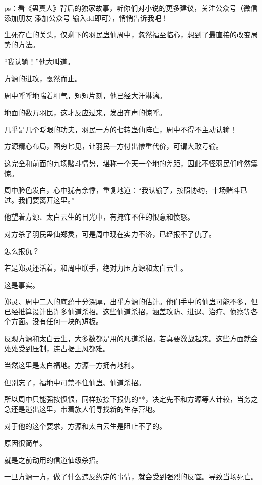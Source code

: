 
\begin{this_body}

ps：看《蛊真人》背后的独家故事，听你们对小说的更多建议，关注公众号（微信添加朋友-添加公众号-输入dd即可），悄悄告诉我吧！

生死存亡的关头，仅剩下的羽民蛊仙周中，忽然福至临心，想到了最直接的改变局势的方法。

“我认输！”他大叫道。

方源的进攻，戛然而止。

周中呼呼地喘着粗气，短短片刻，他已经大汗淋漓。

地面的数万羽民，这才反应过来，发出齐声的惊呼。

几乎是几个眨眼的功夫，羽民一方的七转蛊仙阵亡，周中不得不主动认输！

方源精心布局，图穷匕见，让羽民一方付出惨重代价，可谓大败亏输。

这完全和前面的九场赌斗情势，堪称一个天一个地的差距，因此不怪羽民们哗然震惊。

周中脸色发白，心中犹有余悸，重复地道：“我认输了，按照协约，十场赌斗已过。我们要离开这里。”

他望着方源、太白云生的目光中，有掩饰不住的恨意和愤怒。

对方杀了羽民蛊仙郑灵，可是周中现在实力不济，已经报不了仇了。

怎么报仇？

若是郑灵还活着，和周中联手，绝对力压方源和太白云生。

这是事实。

郑灵、周中二人的底蕴十分深厚，出乎方源的估计。他们手中的仙蛊可能不多，但已经推算设计出许多仙道杀招。这些仙道杀招，涵盖攻防、进退、治疗、侦察等各个方面。没有任何一块的短板。

反观方源和太白云生，大多数都是用的凡道杀招。若真要激战起来。这些方面就会处处受到压制，连占据上风都难。

当然这里是太白福地。方源一方拥有地利。

但别忘了，福地中可禁不住仙蛊、仙道杀招。

所以周中只能强按愤恨，同样按捺下报仇的**，决定先不和方源等人计较，当务之急还是逃出这里，带着族人们寻找新的生存营地。

对于他的这个要求，方源和太白云生是阻止不了的。

原因很简单。

就是之前动用的信道仙级杀招。

一旦方源一方，做了什么违反约定的事情，就会受到强烈的反噬。导致当场死亡。


\end{this_body}
